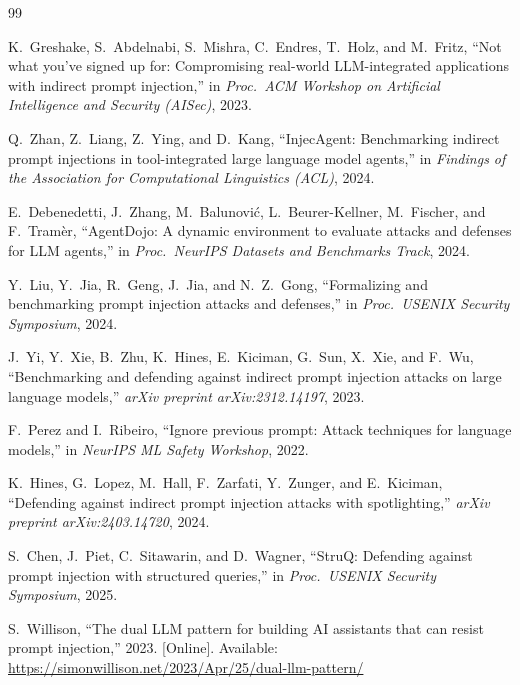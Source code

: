 \documentclass[11pt]{article}
\begin{document}
\begin{thebibliography}{99}

K.~Greshake, S.~Abdelnabi, S.~Mishra, C.~Endres, T.~Holz, and M.~Fritz,
``Not what you've signed up for: Compromising real-world LLM-integrated
applications with indirect prompt injection,'' in
\emph{Proc.\ ACM Workshop on Artificial Intelligence and Security (AISec)},
2023.

Q.~Zhan, Z.~Liang, Z.~Ying, and D.~Kang,
``InjecAgent: Benchmarking indirect prompt injections in tool-integrated
large language model agents,'' in \emph{Findings of the Association for
Computational Linguistics (ACL)}, 2024.

E.~Debenedetti, J.~Zhang, M.~Balunovi\'c, L.~Beurer-Kellner, M.~Fischer,
and F.~Tram\`er,
``AgentDojo: A dynamic environment to evaluate attacks and defenses for
LLM agents,'' in \emph{Proc.\ NeurIPS Datasets and Benchmarks Track}, 2024.

Y.~Liu, Y.~Jia, R.~Geng, J.~Jia, and N.~Z.~Gong,
``Formalizing and benchmarking prompt injection attacks and defenses,'' in
\emph{Proc.\ USENIX Security Symposium}, 2024.

J.~Yi, Y.~Xie, B.~Zhu, K.~Hines, E.~Kiciman, G.~Sun, X.~Xie, and F.~Wu,
``Benchmarking and defending against indirect prompt injection attacks on
large language models,'' \emph{arXiv preprint arXiv:2312.14197}, 2023.

F.~Perez and I.~Ribeiro,
``Ignore previous prompt: Attack techniques for language models,'' in
\emph{NeurIPS ML Safety Workshop}, 2022.

K.~Hines, G.~Lopez, M.~Hall, F.~Zarfati, Y.~Zunger, and E.~Kiciman,
``Defending against indirect prompt injection attacks with spotlighting,''
\emph{arXiv preprint arXiv:2403.14720}, 2024.

S.~Chen, J.~Piet, C.~Sitawarin, and D.~Wagner,
``StruQ: Defending against prompt injection with structured queries,'' in
\emph{Proc.\ USENIX Security Symposium}, 2025.

S.~Willison,
``The dual LLM pattern for building AI assistants that can resist prompt
injection,'' 2023. [Online]. Available:
\url{https://simonwillison.net/2023/Apr/25/dual-llm-pattern/}


\end{thebibliography}
\end{document}
